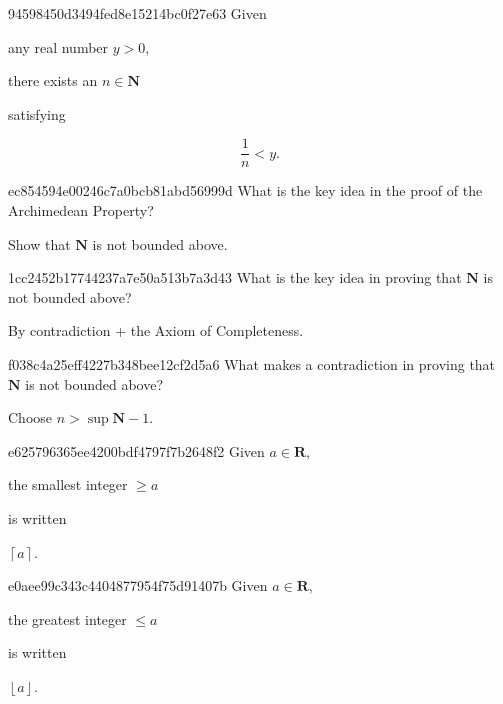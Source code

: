 \begin{note}{94598450d3494fed8e15214bc0f27e63}
    Given \begin{icloze}{3}any real number \({ y > 0 }\),\end{icloze} \begin{icloze}{2}there exists an \({ n \in \mathbf{N} }\)\end{icloze} satisfying
    \begin{icloze}{1}
        \[
            \frac{1}{n} < y.
        \]
    \end{icloze}
\end{note}

\begin{note}{ec854594e00246c7a0bcb81abd56999d}
    What is the key idea in the proof of the Archimedean Property?

    \begin{cloze}{1}
        Show that \({ \mathbf{N} }\) is not bounded above.
    \end{cloze}
\end{note}

\begin{note}{1cc2452b17744237a7e50a513b7a3d43}
    What is the key idea in proving that \({ \mathbf{N} }\) is not bounded above?

    \begin{cloze}{1}
        By contradiction + the Axiom of Completeness.
    \end{cloze}
\end{note}

\begin{note}{f038c4a25eff4227b348bee12cf2d5a6}
    What makes a contradiction in proving that \({ \mathbf{N} }\) is not bounded above?

    \begin{cloze}{1}
        Choose \({ n > \sup \mathbf{N} - 1 }\).
    \end{cloze}
\end{note}

\begin{note}{e625796365ee4200bdf4797f7b2648f2}
    Given \({ a \in \mathbf{R} }\), \begin{icloze}{1}the smallest integer \({ \geq a }\)\end{icloze} is written \begin{icloze}{2}\({ \left\lceil a \right\rceil }\).\end{icloze}
\end{note}

\begin{note}{e0aee99c343c4404877954f75d91407b}
    Given \({ a \in \mathbf{R} }\), \begin{icloze}{1}the greatest integer \({ \leq a }\)\end{icloze} is written \begin{icloze}{2}\({ \left\lfloor a \right\rfloor }\).\end{icloze}
\end{note}

